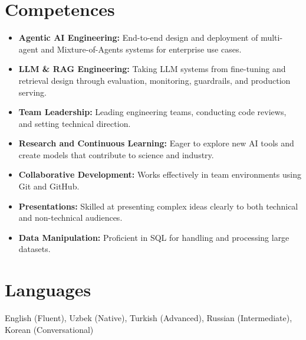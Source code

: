 \documentclass[11pt,a4paper]{article}
\begin{document}
\section*{Competences}
\begin{itemize}
    \item \textbf{Agentic AI Engineering:} End-to-end design and deployment of multi-agent and
Mixture-of-Agents systems for enterprise use cases.
    \item \textbf{LLM \& RAG Engineering:} Taking LLM systems from fine-tuning and retrieval design
through evaluation, monitoring, guardrails, and production serving.
    \item \textbf{Team Leadership:} Leading engineering teams, conducting code reviews, and setting
technical direction.
    \item \textbf{Research and Continuous Learning:} Eager to explore new AI tools and create models
that contribute to science and industry.
    \item \textbf{Collaborative Development:} Works effectively in team environments using Git and
GitHub.
    \item \textbf{Presentations:} Skilled at presenting complex ideas clearly to both technical and
non-technical audiences.
    \item \textbf{Data Manipulation:} Proficient in SQL for handling and processing large datasets.
\end{itemize}

\section*{Languages}
English (Fluent), Uzbek (Native), Turkish (Advanced), Russian (Intermediate), Korean (Conversational)
\end{document}
